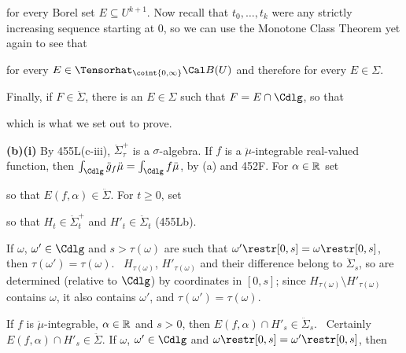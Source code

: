 {\noindent for every Borel set $E\subseteq U^{k+1}$.   Now recall that
$t_0,\ldots,t_k$ were any strictly increasing sequence starting at $0$, so
we can use the Monotone Class Theorem yet again to see that


\noindent for every $E\in\Tensorhat_{\coint{0,\infty}}\Cal B(U)$
and therefore for every $E\in\Sigma$.

\medskip

 Finally, if $F\in\ddot\Sigma$,
there is an $E\in\Sigma$ such that $F=E\cap\Cdlg$, so that


\noindent which is what we set out to prove.

\medskip

{\bf (b)(i)} By 455L(c-iii), $\ddot\Sigma^+_{\tau}$ is a $\sigma$-algebra.
If $f$ is a $\ddot\mu$-integrable real-valued function, then
$\int_{\Cdlg}\ddot g_f\ddot\mu=\int_{\Cdlg}f\ddot\mu$, by (a) and 452F.
For $\alpha\in\Bbb R$ set


\noindent so that $E(f,\alpha)\in\ddot\Sigma$.   For $t\ge 0$, set


\noindent so that $H_t\in\ddot\Sigma_t^+$ and $H'_t\in\ddot\Sigma_t$
(455Lb).

\medskip

 If $\omega$, $\omega'\in\Cdlg$ and $s>\tau(\omega)$
are such that
$\omega'\restr[0,s]=\omega\restr[0,s]$, then
$\tau(\omega')=\tau(\omega)$.   \Prf\ $H_{\tau(\omega)}$,
$H'_{\tau(\omega)}$ and their difference belong to $\ddot\Sigma_s$,
so are determined (relative to $\Cdlg$) by coordinates in $[0,s]$;
since $H_{\tau(\omega)}\setminus H'_{\tau(\omega)}$ contains $\omega$, it
also contains $\omega'$, and $\tau(\omega')=\tau(\omega)$.\ \Qed

\medskip

 If $f$ is $\ddot\mu$-integrable, $\alpha\in\Bbb R$ and
$s>0$, then $E(f,\alpha)\cap H'_s\in\ddot\Sigma_s$.
\Prf\ Certainly $E(f,\alpha)\cap H'_s\in\ddot\Sigma$.   If $\omega$,
$\omega'\in\Cdlg$ and $\omega\restr[0,s]=\omega'\restr[0,s]$,
then

}
